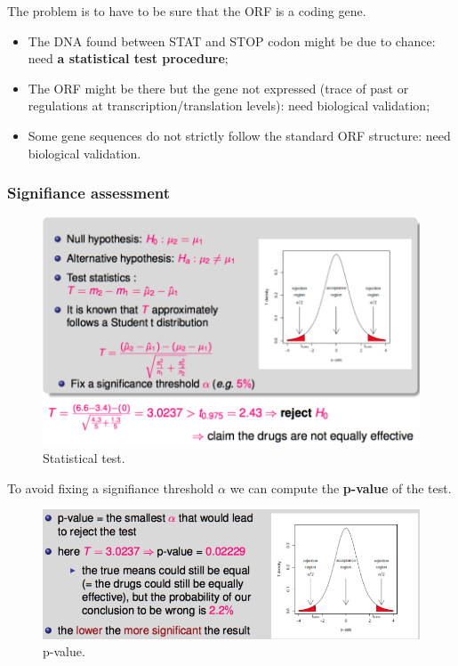 The problem is to have to be sure that the ORF is a coding gene.
\begin{itemize}
	\item The DNA found between STAT and STOP codon might be due to chance: need \textbf{a statistical test procedure};
	\item The ORF might be there but the gene not expressed (trace of past or regulations at transcription/translation levels): need biological validation;
	\item Some gene sequences do not strictly follow the standard ORF structure: need biological validation.
\end{itemize}

\subsubsection{Signifiance assessment}

\begin{figure}[htp]
	\centering
	\includegraphics[scale=0.4]{images/06_test.png}
 	\caption{Statistical test. }
\end{figure}

To avoid fixing a signifiance threshold $\alpha$ we can compute the \textbf{p-value} of the test.

\begin{figure}[htp]
	\centering
	\includegraphics[scale=0.4]{images/07_pval.png}
 	\caption{p-value. }
\end{figure}

